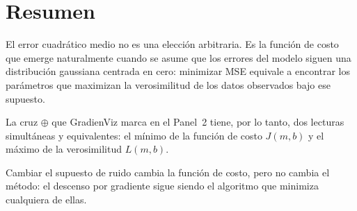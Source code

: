 \documentclass[12pt, a4paper]{article}
\begin{document}
\section*{Resumen}

El error cuadrático medio no es una elección arbitraria.
Es la función de costo que emerge naturalmente cuando se asume que
los errores del modelo siguen una distribución gaussiana centrada en
cero: minimizar MSE equivale a encontrar los parámetros que maximizan
la verosimilitud de los datos observados bajo ese supuesto.

La cruz $\oplus$ que GradienViz marca en el Panel~2 tiene, por lo
tanto, dos lecturas simultáneas y equivalentes:
el mínimo de la función de costo $J(m,b)$ y
el máximo de la verosimilitud $L(m,b)$.

Cambiar el supuesto de ruido cambia la función de costo, pero no
cambia el método: el descenso por gradiente sigue siendo el algoritmo
que minimiza cualquiera de ellas.
\end{document}

